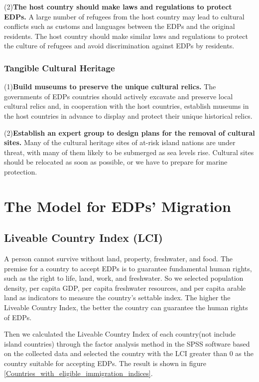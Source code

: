 \documentclass[12pt]{article}  %
\begin{document}
(2)\textbf{The host country should make laws and regulations to protect EDPs.} A large number of refugees from the host country may lead to cultural conflicts such as customs and languages between the EDPs and the original residents. The host country should make similar laws and regulations to protect the culture of refugees and avoid discrimination against EDPs by residents.







\subsubsection{Tangible Cultural Heritage}

(1)\textbf{Build museums to preserve the unique cultural relics.} The governments of EDPs countries should actively excavate and preserve local cultural relics and, in cooperation with the host countries, establish museums in the host countries in advance to display and protect their unique historical relics.



(2)\textbf{Establish an expert group to design plans for the removal of cultural sites.} Many of the cultural heritage sites of at-risk island nations are under threat, with many of them likely to be submerged as sea levels rise. Cultural sites should be relocated as soon as possible, or we have to prepare for marine protection. 


\newpage


\section{The Model for EDPs’ Migration}

\subsection{Liveable Country Index (LCI)}
A person cannot survive without land, property, freshwater, and food. The premise for a country to accept EDPs is to guarantee fundamental human rights, such as the right to life, land, work, and freshwater. So we selected population density, per capita GDP, per capita freshwater resources, and per capita arable land as indicators to measure the country's settable index. The higher the Liveable Country Index, the better the country can guarantee the human rights of EDPs.

Then we calculated the Liveable Country Index of each country(not include island countries) through the factor analysis method in the SPSS software based on the collected data and selected the country with the LCI greater than 0 as the country suitable for accepting EDPs. The result is shown in figure \ref{Countries_with_eligible_immigration_indices}.
\end{document}
